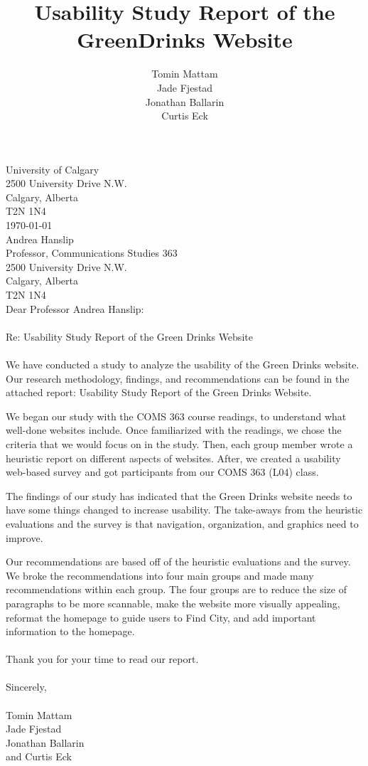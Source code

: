 \documentclass[12pt]{article}
\title{Usability Study Report of the GreenDrinks Website}
\author{Tomin Mattam \\Jade Fjestad \\                                                                                                               Jonathan Ballarin                                                                                                            	\\  Curtis Eck}
\begin{document}
University of Calgary \\
2500 University Drive N.W. \\
Calgary, Alberta \\
T2N 1N4 \\
 \newline
\today  \newline \\
Andrea Hanslip \\
Professor, Communications Studies 363   \\
2500 University Drive N.W. \\
Calgary, Alberta \\
T2N 1N4 \\

Dear Professor Andrea Hanslip: \\ \\
Re: Usability Study Report of the Green Drinks Website \\ \\
We have conducted a study to analyze the usability of the Green Drinks website. Our research methodology, findings, and recommendations can be found in the attached report: Usability Study Report of the Green Drinks Website.

We began our study with the COMS 363 course readings, to understand what well-done websites include. Once familiarized with the readings, we chose the criteria that we would focus on in the study. Then, each group member wrote a heuristic report on different aspects of websites. After, we created a usability web-based survey and got participants from our COMS 363 (L04) class. 

The findings of our study has indicated that the Green Drinks website needs to have some things changed to increase usability. The take-aways from the heuristic evaluations and the survey is that navigation, organization, and graphics need to improve. 

Our recommendations are based off of the heuristic evaluations and the survey. We broke the recommendations into four main groups and made many recommendations within each group. The four groups are to reduce the size of paragraphs to be more scannable, make the website more visually appealing, reformat the homepage to guide users to Find City, and add important information to the homepage.
\\ \\
Thank you for your time to read our report. \\ \\
Sincerely, \\ \\
Tomin Mattam                                                                                                              \\ Jade Fjestad                                                                                                              \\ Jonathan Ballarin                                                                                                           \\ and Curtis Eck
 
\end{document}
